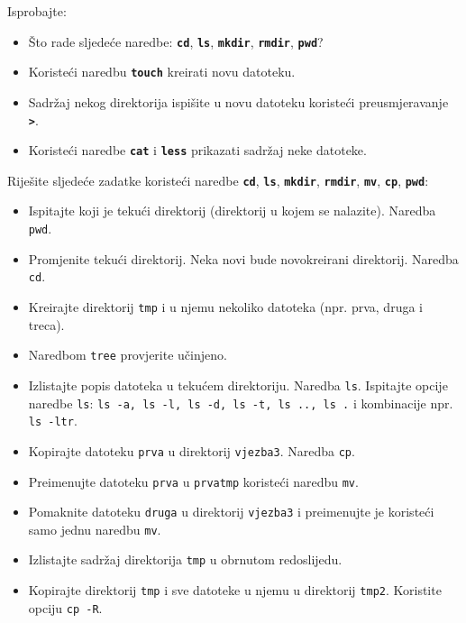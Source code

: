 \begin{zadatak}
Isprobajte:
\begin{itemize}
\item Što rade sljedeće naredbe: \textbf{\texttt{cd}}, \textbf{\texttt{ls}}, \textbf{\texttt{mkdir}}, \textbf{\texttt{rmdir}}, \textbf{\texttt{pwd}}?
\item Koristeći naredbu \textbf{\texttt{touch}} kreirati novu datoteku.
\item Sadržaj nekog direktorija ispišite u novu datoteku koristeći preusmjeravanje\textbf{ \texttt{>}}.
\item Koristeći naredbe \textbf{\texttt{cat}} i \textbf{\texttt{less}} prikazati sadržaj neke datoteke.
\end{itemize}

\end{zadatak}

\begin{zadatak} Riješite sljedeće zadatke koristeći naredbe \textbf{\texttt{cd}}, \textbf{\texttt{ls}}, \textbf{\texttt{mkdir}}, \textbf{\texttt{rmdir}}, \textbf{\texttt{mv}}, \textbf{\texttt{cp}}, \textbf{\texttt{pwd}}:
\begin{itemize}
\item Ispitajte koji je tekući direktorij (direktorij u kojem se nalazite). Naredba \texttt{pwd}.
\item Promjenite tekući direktorij. Neka novi bude novokreirani direktorij. Naredba \texttt{cd}.
\item Kreirajte direktorij \texttt{tmp} i u njemu nekoliko datoteka (npr. prva, druga i treca).
\item Naredbom \texttt{tree} provjerite učinjeno.
\item Izlistajte popis datoteka u tekućem direktoriju. Naredba \texttt{ls}. Ispitajte opcije naredbe \texttt{ls}: \texttt{ls -a, ls -l, ls -d, ls -t, ls .., ls .} i kombinacije npr. \texttt{ls -ltr}.
\item Kopirajte datoteku \texttt{prva} u direktorij \texttt{vjezba3}. Naredba \texttt{cp}.
\item Preimenujte datoteku \texttt{prva} u \texttt{prvatmp} koristeći naredbu \texttt{mv}.
\item Pomaknite datoteku \texttt{druga} u direktorij \texttt{vjezba3} i preimenujte je koristeći samo jednu naredbu \texttt{mv}.
\item Izlistajte sadržaj direktorija \texttt{tmp} u obrnutom redoslijedu.
\item Kopirajte direktorij \texttt{tmp} i sve datoteke u njemu u direktorij \texttt{tmp2}. Koristite opciju \texttt{cp -R}.
\end{itemize}
\end{zadatak}
